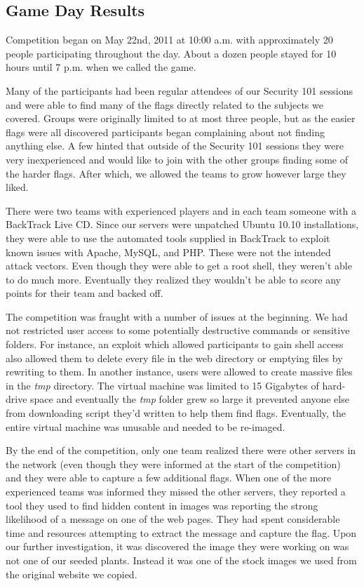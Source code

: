 \documentclass[10pt]{article}
\begin{document}
\subsection{Game Day Results}
Competition began on May 22nd, 2011 at 10:00 a.m. with approximately 20 people
participating throughout the day. About a dozen people stayed for 10 hours until
7 p.m. when we called the game. 

Many of the participants had been regular attendees of our Security 101 sessions
and were able to find many of the flags directly related to the subjects we
covered. Groups were originally limited to at most three people, but as the
easier flags were all discovered participants began complaining about not
finding anything else. A few hinted that outside of the Security 101 sessions
they were very inexperienced and would like to join with the other groups
finding some of the harder flags. After which, we allowed the teams to grow 
however large they liked.

There were two teams with experienced players and in each team someone with a
BackTrack Live CD. Since our servers were unpatched Ubuntu 10.10 installations,
they were able to use the automated tools supplied in BackTrack to exploit
known issues with Apache, MySQL, and PHP. These were not the intended attack
vectors. Even though they were able to get a root shell, they weren't able to do
much more. Eventually they realized they wouldn't be able to score any points
for their team and backed off. 

The competition was fraught with a number of issues at the beginning. We had not
restricted user access to some potentially destructive commands or sensitive
folders. For instance, an exploit which allowed participants to gain shell
access also allowed them to delete every file in the web directory or emptying
files by rewriting to them. In another instance, users were allowed to create
massive files in the \textit{tmp} directory. The virtual machine was limited to
15 Gigabytes of hard-drive space and eventually the \textit{tmp} folder grew so
large it prevented anyone else from downloading script they'd written to help
them find flags. Eventually, the entire virtual machine was unusable and needed
to be re-imaged.

By the end of the competition, only one team realized there were other servers
in the network (even though they were informed at the start of the competition)
and they were able to capture a few additional flags. When one of the more
experienced teams was informed they missed the other servers, they reported a
tool they used to find hidden content in images was reporting the strong
likelihood of a message on one of the web pages. They had spent considerable
time and resources attempting to extract the message and capture the flag. Upon
our further investigation, it was discovered the image they were working on was
not one of our seeded plants. Instead it was one of the stock images we used
from the original website we copied.
\end{document}
